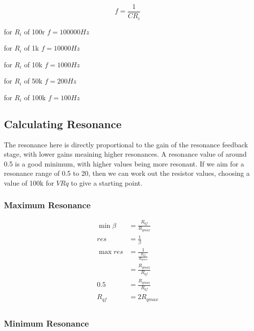 \documentclass{article}
\begin{document}
\begin{equation}
  f = \frac{1}{CR_i}
\end{equation}

\begin{description}
  \item for $R_i$ of 100r $f = 100000Hz$
  \item for $R_i$ of 1k   $f = 10000Hz$
  \item for $R_i$ of 10k  $f = 1000Hz$
  \item for $R_i$ of 50k  $f = 200Hz$
  \item for $R_i$ of 100k $f = 100Hz$
\end{description}

\subsection{Calculating Resonance}

The resonance here is directly proportional to the gain of the resonance feedback stage, with lower gains meaining higher resonances. A resonance value of around 0.5 is a good minimum, with higher values being more resonant. If we aim for a resonance range of 0.5 to 20, then we can work out the resistor values, choosing a value of 100k for $VRq$ to give a starting point.

\subsubsection{Maximum Resonance}

\begin{equation*}
\begin{split}
  {\min \beta} & = \frac{R_{qf}}{R_{qmax}} \\
  res          & = \frac{1}{\beta} \\
  {\max res}   & = \frac{1}{\frac{R_{qf}}{R_{qmax}}} \\
               & = \frac{R_{qmax}}{R_{qf}} \\
  0.5          & = \frac{R_{qmax}}{R_{qf}} \\
  R_{qf}       & = 2 R_{qmax} \\
\end{split}
\end{equation*}

\subsubsection{Minimum Resonance}
\end{document}
